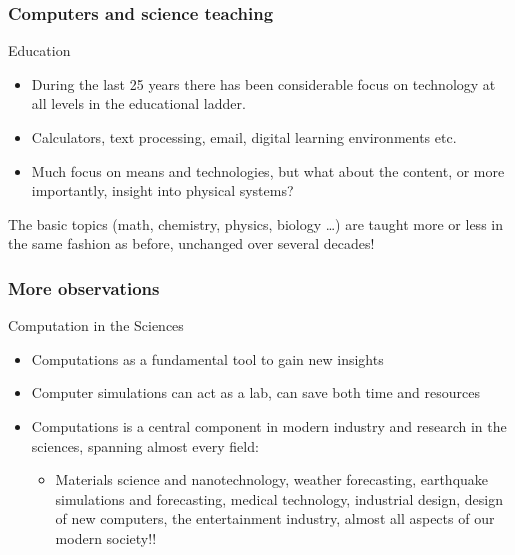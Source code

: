 \documentclass{beamer}
\begin{document}
\begin{frame}
\frametitle{Computers and science teaching}

\begin{block}{Education }

\begin{itemize}
\item During the  last 25 years  there has been considerable focus on  technology at all levels in the educational ladder.

\item Calculators, text processing, email, digital learning environments etc.

\item Much focus on means and technologies, but what about the content, or more importantly, insight into  physical systems?
\end{itemize}

\noindent
The basic topics (math, chemistry, physics, biology \dots) are taught more or less in the same fashion as before, unchanged over several decades! 
\end{block}
\end{frame}

\begin{frame}
\frametitle{More observations}

\begin{block}{Computation in the Sciences }

\begin{itemize}
\item Computations as a fundamental tool  to gain new insights

\item Computer simulations can act as  a lab, can save both time and resources 

\item Computations is a central component in modern industry and research in the sciences, spanning almost every field:
\begin{itemize}

 \item Materials science and nanotechnology, weather forecasting, earthquake simulations and forecasting, medical technology, industrial design, design of new computers, the entertainment industry, almost all aspects of our modern society!!
\end{itemize}

\noindent
\end{itemize}

\noindent
\end{block}
\end{frame}
\end{document}
